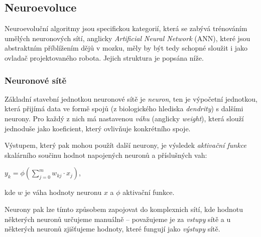 \documentclass[a4]{article}
\begin{document}
\subsection{Neuroevoluce}
Neuroevoluční algoritmy jsou specifickou kategorií, která se zabývá trénováním umělých neuronových sítí, anglicky \emph{Artificial Neural Network} (ANN), které jsou abstraktním příblížením dějů v mozku, měly by být tedy schopné sloužit i jako ovladač projektovaného robota. Jejich struktura je popsána níže.
\subsubsection{Neuronové sítě}
Základní stavební jednotkou neuronové sítě je \emph{neuron}, ten je výpočetní jednotkou, která přijímá data ve formě spojů (z biologického hlediska \emph{dendrity}) s dalšími neurony. Pro každý z nich má nastavenou \emph{váhu} (anglicky \emph{weight}), která slouží jednoduše jako koeficient, který ovlivňuje  konkrétního spoje.\par
Výstupem, který pak mohou použít další neurony, je výsledek \emph{aktivační funkce} skalárního součinu hodnot napojených neuronů a příslušných vah\cite{neuron}:
\begin{center}$y_k=\phi(\sum_{j=0}^m w_{kj}\cdot x_j)$,\end{center}
kde $w$ je váha hodnoty neuronu $x$ a $\phi$ aktivační funkce.\par
Neurony pak lze tímto způsobem zapojovat do komplexnich sítí, kde hodnotu některých neuronů určujeme manuálně -- považujeme je za \emph{vstupy} sítě a u některých neuronů zjišťujeme hodnoty, které fungují jako \emph{výstupy} sítě.
\end{document}
